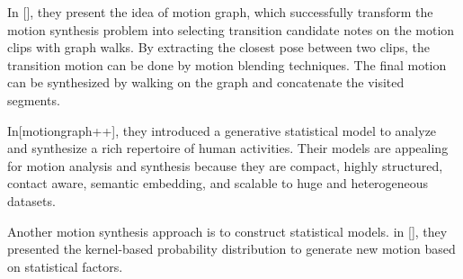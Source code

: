 In [], they present the idea of motion graph, which successfully transform the motion synthesis problem 
into selecting transition candidate notes on the motion clips with graph walks. 
By extracting the closest pose between two clips, the transition motion can be done by motion blending techniques.
The final motion can be synthesized by walking on the graph and concatenate the visited segments.

In[motiongraph++], they introduced a generative statistical model to analyze and
synthesize a rich repertoire of human activities. 
Their models are appealing for motion analysis and synthesis because they are compact,
highly structured, contact aware, semantic embedding, and scalable to huge and heterogeneous datasets.

Another motion synthesis approach is to construct statistical models. in [], they presented the kernel-based 
probability distribution to generate new motion based on statistical factors.